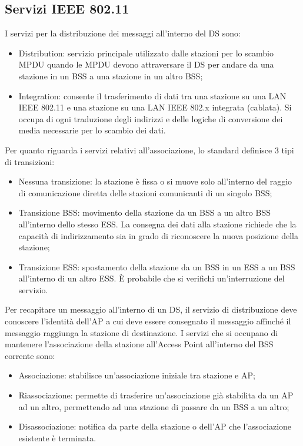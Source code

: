 \subsection{Servizi IEEE 802.11}

I servizi per la distribuzione dei messaggi all'interno del DS sono:
\begin{itemize}
    \item Distribution: servizio principale utilizzato dalle stazioni per lo scambio MPDU quando le MPDU devono attraversare il DS per andare da una stazione in un BSS a una stazione in un altro BSS;
	\item Integration: consente il trasferimento di dati tra una stazione su una LAN IEEE 802.11 e una stazione su una LAN IEEE 802.x integrata (cablata). Si occupa di ogni traduzione degli indirizzi e delle logiche di conversione dei media necessarie per lo scambio dei dati.
\end{itemize}

Per quanto riguarda i servizi relativi all'associazione, lo standard definisce 3 tipi di transizioni:
\begin{itemize}
    \item Nessuna transizione: la stazione è fissa o si muove solo all'interno del raggio di comunicazione diretta delle stazioni comunicanti di un singolo BSS;
	\item Transizione BSS: movimento della stazione da un BSS a un altro BSS all'interno dello stesso ESS. La consegna dei dati alla stazione richiede che la capacità di indirizzamento sia in grado di riconoscere la nuova posizione della stazione;
	\item Transizione ESS: spostamento della stazione da un BSS in un ESS a un BSS all'interno di un altro ESS. È probabile che si verifichi un'interruzione del servizio.
\end{itemize}

Per recapitare un messaggio all'interno di un DS, il servizio di distribuzione deve conoscere l'identità dell'AP a cui deve essere consegnato il messaggio affinché il messaggio raggiunga la stazione di destinazione. 
I servizi che si occupano di mantenere l'associazione della stazione all'Access Point all'interno del BSS corrente sono:
\begin{itemize}
    \item Associazione: stabilisce un'associazione iniziale tra stazione e AP;
	\item Riassociazione: permette di trasferire un'associazione già stabilita da un AP ad un altro, permettendo ad una stazione di passare da un BSS a un altro;
	\item Disassociazione: notifica da parte della stazione o dell'AP che l'associazione esistente è terminata.
\end{itemize}

